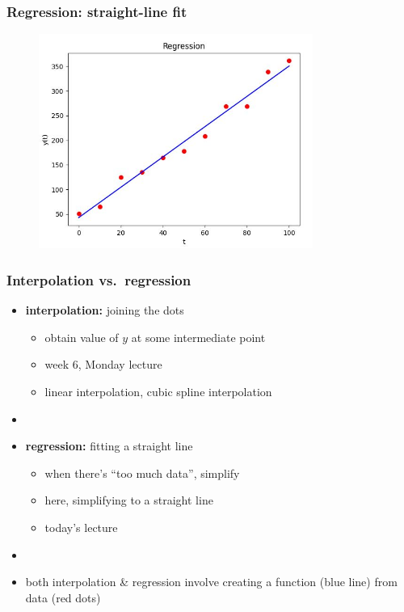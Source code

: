 \documentclass[english,14pt]{beamer}
\newcommand\red[1]{{\color{red} #1}}
\newcommand\blue[1]{{\color{blue} #1}}
\begin{document}

\begin{frame}[fragile]

\frametitle{Regression: straight-line fit}

\vspace*{-3mm}
\begin{figure}[ht]
	\centering
	\includegraphics[width=0.8\textwidth]{figures/Week6MonLinearRegression}
\end{figure}

\end{frame}


\begin{frame}[fragile]

\frametitle{Interpolation vs.\ regression}

\begin{itemize}
	\item \textbf{interpolation:} joining the dots
	\begin{itemize}
		\item obtain value of $y$ at some intermediate point
		\item week 6, Monday lecture
		\item linear interpolation, cubic spline interpolation
	\end{itemize}
	\item[]
	\item \textbf{regression:} fitting a straight line
	\begin{itemize}
		\item when there's ``too much data'', simplify
		\item here, simplifying to a straight line
		\item today's lecture
	\end{itemize}
	\item[]
	\item both interpolation \& regression involve creating a function \blue{(blue line)} from data \red{(red dots)}
\end{itemize}

\end{frame}
\end{document}
